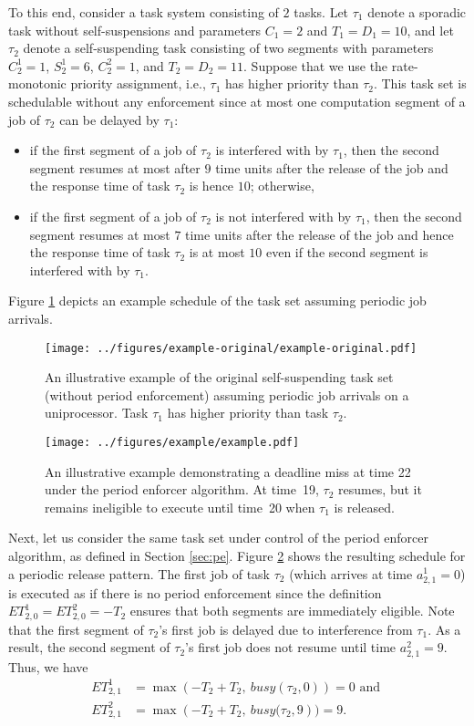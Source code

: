 To this end, consider a task system consisting of $2$ tasks. Let $\tau_1$ denote a sporadic task without self-suspensions and parameters $C_1 = 2$ and $T_1=D_1=10$, and let $\tau_2$ denote a self-suspending task consisting of two segments with parameters  $C_2^1 = 1$,  $S_2^1 = 6$, $C_2^2=1$, and $ T_2=D_2=11$. Suppose that we use the rate-monotonic priority assignment, i.e., $\tau_1$ has higher priority than $\tau_2$. This task set is schedulable without any enforcement since at most one computation segment of a job of $\tau_2$ can be delayed by $\tau_1$: 
\begin{itemize}
	\item if the first segment of a job of $\tau_2$ is interfered with by $\tau_1$, then the second segment resumes at most after $9$ time units after the release of the job and the response time of task $\tau_2$ is hence $10$; otherwise,
	\item  if the first segment of a job of $\tau_2$ is not interfered with by $\tau_1$, then the second segment resumes at most $7$ time units after the release of the job and hence the  response time of task $\tau_2$ is at most $10$ even if the second segment is interfered with by $\tau_1$.
\end{itemize}
Figure \ref{fig:example-original} depicts an example schedule of the task set assuming periodic job arrivals.


\begin{figure}[t]
  \centering
  \texttt{[image: ../figures/example-original/example-original.pdf]}
  \caption{An illustrative example of the original self-suspending task set (without period enforcement) assuming periodic job arrivals on a uniprocessor. Task $\tau_1$ has higher priority than task $\tau_2$.}
  \label{fig:example-original}
  \end{figure}
\begin{figure}[t]
  \centering
  \texttt{[image: ../figures/example/example.pdf]}
  \caption{An illustrative example demonstrating a deadline miss at time 22
    under the period enforcer algorithm. At time~19, $\tau_2$ resumes, but it remains ineligible to execute until time~20 when $\tau_1$ is released.}
\label{fig:example}  
\end{figure}


Next, let us consider the same task set under control of the period enforcer algorithm, as defined in Section \ref{sec:pe}.
Figure \ref{fig:example} shows the resulting schedule for a periodic release pattern. The first job of task $\tau_2$ (which arrives at time $a^1_{2,1} =  0$) is executed as if there is no period enforcement since the definition $ET_{2,0}^1 = ET_{2,0}^2 = -T_2$ ensures that both segments are immediately eligible. Note that the first segment of $\tau_2$'s first job is delayed due to interference from $\tau_1$. As a result, the second segment of $\tau_2$'s first job does not resume until time $a^2_{2,1} = 9$. Thus, we have
\begin{align*}
	ET_{2,1}^1 & = \max\left(-T_2 + T_2,\ \mathit{busy}(\tau_2, 0)\right) = 0  \text{ and }
\\
	ET_{2,1}^2 & = \max\left(-T_2 + T_2,\ \mathit{busy}(\tau_2, 9\right) ) = 9.
\end{align*}

